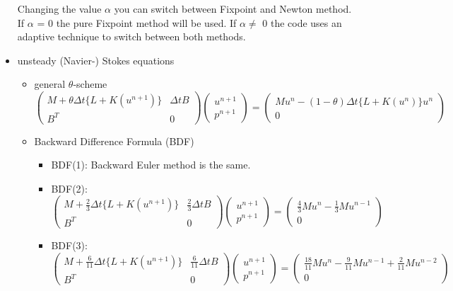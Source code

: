 \begin{itemize}
Changing the value $\alpha$ you can switch between Fixpoint and Newton method. If $\alpha$ = 0 the pure Fixpoint method will be used. If $\alpha \ne$ 0 the code uses an adaptive technique to switch between both methods.
\item unsteady (Navier-) Stokes equations
\begin{itemize}
\item general $\theta$-scheme
\begin{equation*}
\begin{pmatrix} M+\theta\Delta t \{L+  K(u^{n+1})\} & \Delta t B \\ B^T & 0 \end{pmatrix} \begin{pmatrix} u^{n+1} \\ p^{n+1} \end{pmatrix} = \begin{pmatrix} M u^n - (1-\theta)\Delta t \{L+K(u^n)\} u^n  \\ 0 \end{pmatrix}
\end{equation*}
\item Backward Difference Formula (BDF)
\begin{itemize}
\item BDF(1): Backward Euler method is the same.
\item BDF(2):
\begin{equation*}
\begin{pmatrix} M+\frac{2}{3}\Delta t \{L+K(u^{n+1})\} & \frac{2}{3}\Delta t B \\ B^T & 0 \end{pmatrix} \begin{pmatrix} u^{n+1} \\ p^{n+1} \end{pmatrix} = \begin{pmatrix} \frac{4}{3}M u^n - \frac{1}{3}M u^{n-1} \\ 0 \end{pmatrix}
\end{equation*}
\item BDF(3):
\begin{equation*}
\begin{pmatrix} M+\frac{6}{11}\Delta t \{L+K(u^{n+1})\} & \frac{6}{11}\Delta t B \\ B^T & 0 \end{pmatrix} \begin{pmatrix} u^{n+1} \\ p^{n+1} \end{pmatrix} = \begin{pmatrix} \frac{18}{11}M u^n - \frac{9}{11}M u^{n-1} + \frac{2}{11}M u^{n-2} \\ 0 \end{pmatrix}
\end{equation*}
\end{itemize}
\end{itemize}
\end{itemize}



